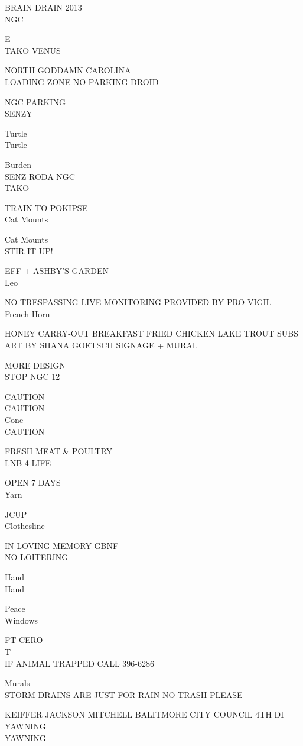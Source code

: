 \documentclass[10pt,letterpaper]{article}
\begin{document}
BRAIN DRAIN 2013\\
NGC

E\\
TAKO VENUS

NORTH GODDAMN CAROLINA\\
LOADING ZONE NO PARKING DROID

NGC PARKING\\
SENZY

Turtle\\
Turtle

Burden\\
SENZ RODA NGC\\
TAKO

TRAIN TO POKIPSE\\
Cat Mounts

Cat Mounts\\
STIR IT UP!

EFF + ASHBY'S GARDEN\\
Leo

NO TRESPASSING LIVE MONITORING PROVIDED BY PRO VIGIL\\
French Horn

HONEY CARRY{-}OUT BREAKFAST FRIED CHICKEN LAKE TROUT SUBS\\
ART BY SHANA GOETSCH SIGNAGE + MURAL

MORE DESIGN\\
STOP NGC 12

CAUTION\\
CAUTION\\
Cone\\
CAUTION

FRESH MEAT \& POULTRY\\
LNB 4 LIFE

OPEN 7 DAYS\\
Yarn

JCUP\\
Clothesline

IN LOVING MEMORY GBNF\\
NO LOITERING

Hand\\
Hand

Peace\\
Windows

FT CERO\\
T\\
IF ANIMAL TRAPPED CALL 396{-}6286

Murals\\
STORM DRAINS ARE JUST FOR RAIN NO TRASH PLEASE

KEIFFER JACKSON MITCHELL BALITMORE CITY COUNCIL 4TH DI\\
YAWNING\\
YAWNING
\end{document}
